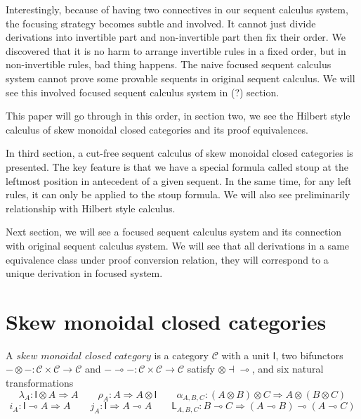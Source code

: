 \documentclass{article}
\newcommand{\ot}{\otimes}
\newcommand{\lolli}{\multimap}
\newcommand{\I}{\mathsf{I}}
\newcommand{\msfL}{\mathsf{L}}
\begin{document}
Interestingly, because of having two connectives in our sequent calculus system, the focusing strategy becomes subtle and involved.
It cannot just divide derivations into invertible part and non-invertible part then fix their order.
We discovered that it is no harm to arrange invertible rules in a fixed order, but in non-invertible rules, bad thing happens.
The naive focused sequent calculus system cannot prove some provable sequents in original sequent calculus.
We will see this involved focused sequent calculus system in (?) section.

This paper will go through in this order, in section two, we see the Hilbert style calculus of skew monoidal closed categories and its proof equivalences.

In third section, a cut-free sequent calculus of skew monoidal closed categories is presented.
The key feature is that we have a special formula called stoup at the leftmost position in antecedent of a given sequent.
In the same time, for any left rules, it can only be applied to the stoup formula.
We will also see preliminarily relationship with Hilbert style calculus.

Next section, we will see a focused sequent calculus system and its connection with original sequent calculus system.
We will see that all derivations in a same equivalence class under proof conversion relation, they will correspond to a unique derivation in focused system.


\section{Skew monoidal closed categories}
A $skew$ $monoidal$ $closed$ $category$\cite{street_skew-closed_2013} is a category $\mathcal{C}$ with a unit $\mathsf{I}$, two bifunctors $- \ot - : \mathcal{C} \times \mathcal{C} \longrightarrow \mathcal{C}$ and $- \lolli - : \mathcal{C} \times \mathcal{C} \longrightarrow \mathcal{C}$
satisfy $\ot \dashv \lolli$, and six natural transformations
\begin{displaymath}
  \lambda_A : \mathsf{I} \otimes A \Longrightarrow A \qquad
  \rho_A : A \Longrightarrow A \otimes \mathsf{I} \qquad
  \alpha_{A,B,C} : (A\otimes B) \otimes C \Longrightarrow A\otimes (B\otimes C)
\end{displaymath}
\begin{displaymath}
  i_A : \I \lolli A \Longrightarrow A \qquad
  j_A : \I \Longrightarrow A \lolli A \qquad
  \msfL_{A, B, C} : B \lolli C \Longrightarrow (A \lolli B) \lolli (A \lolli C)
\end{displaymath}
\end{document}
